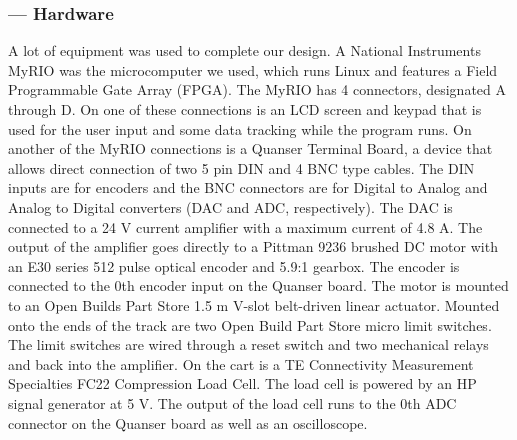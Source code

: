 \subsubsection*{ --- Hardware}
A lot of equipment was used to complete our design. A National Instruments MyRIO was the microcomputer we used, which runs Linux and features a Field Programmable Gate Array (FPGA). The MyRIO has 4 connectors, designated A through D. On one of these connections is an LCD screen and keypad that is used for the user input and some data tracking while the program runs. On another of the MyRIO connections is a Quanser Terminal Board, a device that allows direct connection of two 5 pin DIN and 4 BNC type cables. The DIN inputs are for encoders and the BNC connectors are for Digital to Analog and Analog to Digital converters (DAC and ADC, respectively). The DAC is connected to a 24 V current amplifier with a maximum current of 4.8 A. The output of the amplifier goes directly to a Pittman 9236 brushed DC motor with an E30 series 512 pulse optical encoder and 5.9:1 gearbox. The encoder is connected to the 0th encoder input on the Quanser board. The motor is mounted to an Open Builds Part Store 1.5 m V-slot belt-driven linear actuator. Mounted onto the ends of the track are two Open Build Part Store micro limit switches. The limit switches are wired through a reset switch and two mechanical relays and back into the amplifier. On the cart is a TE Connectivity Measurement Specialties FC22 Compression Load Cell. The load cell is powered by an HP signal generator at 5 V. The output of the load cell runs to the 0th ADC connector on the Quanser board as well as an oscilloscope. 
